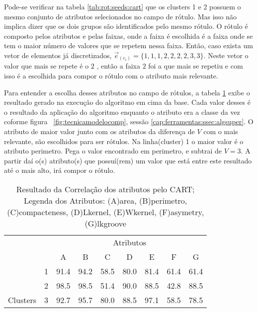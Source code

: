 Pode-se verificar na tabela \ref{tab:rot:seeds:cart} que os clusters 1 e 2 possuem o mesmo conjunto de atributos selecionados no campo de rótulo. Mas isso não implica dizer que os dois grupos são identificados pelo mesmo rótulo. O rótulo é composto pelos atributos e pelas faixas, onde a faixa é escolhida é a faixa onde se tem o maior número de valores que se repetem nessa faixa. Então, caso exista um vetor de elementos já discretizados, ${\vec{e}_{(c_i)}=\{1,1,1,2,2,2,2,3,3\}}$. Neste vetor o valor que mais se repete é o ${2}$ , então a faixa ${2}$ foi a que mais se repetiu e com isso é a escolhida para compor o rótulo com o atributo mais relevante.

Para entender a escolha desses atributos no campo de rótulos, a tabela \ref{tab:matrelevancia:seeds:cart} exibe o resultado gerado na execução do algoritmo em cima da base. Cada valor desses é o resultado da aplicação do algoritmo enquanto o atributo era a classe da vez coforme figura ~\ref{fig:tecnicamodelocomp}, sessão \ref{cap:ferramentas:ssec:algsuper}. O atributo de maior valor junto com os atributos da diferença de ${V}$ com o mais relevante, são escolhidos para ser rótulos. Na linha(cluster) 1 o maior valor é o atributo perimetro. Pega o valor encontrado em perimetro, e subtrai de ${V=3}$. A partir daí o(s) atributo(s) que possuí(rem) um valor que está entre este resultado até o mais alto, irá compor o rótulo.

\begin{table}[!h]
    
    \caption{Resultado da Correlação dos atributos pelo CART; Legenda dos Atributos: (A)area, (B)perimetro, (C)compacteness, (D)Lkernel, (E)Wkernel, (F)asymetry, (G)lkgroove}    
    \centering
   \small\addtolength{\tabcolsep}{+2pt}
    \begin{tabular}{|cl|c|c|c|c|c|c|c|}
        \hline \hline
                                &   & \multicolumn{7}{c|}{Atributos}          \\ \cline{3-9} 
        \multicolumn{1}{|l}{}                            &   & A    & B & C & D & E & F & G \\ \hline
        \multicolumn{1}{|c|}{}                           & 1 & 91.4 & 94.2   & 58.5      & 80.0 & 81.4 & 61.4   & 61.4   \\ \cline{2-9} 
        \multicolumn{1}{|c|}{}                           & 2 & 98.5 & 98.5   & 51.4      & 90.0 & 88.5 & 42.8  & 88.5  \\ \cline{2-9} 
        \multicolumn{1}{|c|}{\multirow{-3}{*}{Clusters}} & 3 & 92.7 & 95.7   & 80.0      & 88.5 & 97.1 & 58.5  & 78.5  \\ \hline
    \end{tabular}
    \label{tab:matrelevancia:seeds:cart} 
\end{table}


